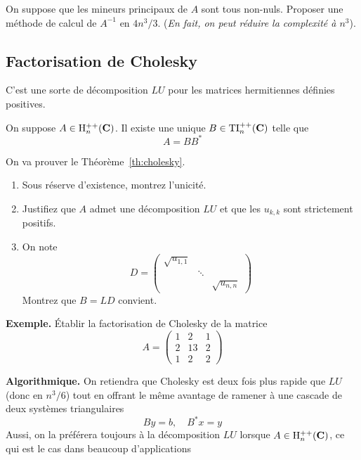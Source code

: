 \begin{exercice}
On suppose que les mineurs principaux de $A$ sont tous non-nuls. Proposer une
méthode de calcul de $A^{-1}$ en $\displaystyle {4n^3}/{3}$. (\emph{En fait,
on peut réduire la complexité à $n^3$}).
\end{exercice}


\subsection{Factorisation de Cholesky}

C'est une sorte de décomposition $LU$ pour les matrices hermitiennes définies
positives.

\begin{theorem}
\label{th:cholesky}
On suppose $A \in \mathrm{H}^{++}_n(\mathbf{C})$. Il existe une unique $B \in \mathrm{TI}^{++}_n(\mathbf{C})$
telle que
\[
A = B B^*
\]
\end{theorem}

\begin{exercice}
On va prouver le Théorème~\ref{th:cholesky}.
\begin{enumerate}
\item Sous réserve d'existence, montrez l'unicité.
\item Justifiez que $A$ admet une décomposition $LU$ et que les $u_{k,k}$ sont strictement positifs.
\item On note 
\[
D = \left(\begin{array}{ccc}
\sqrt{u_{1,1}} & & \\
& \ddots & \\
& & \sqrt{u_{n,n}}
\end{array}\right)
\]
Montrez que $B = LD$ convient.
\end{enumerate}
\end{exercice}

{\bf Exemple.}
Établir la factorisation de Cholesky de la matrice
\[
A = \left(\begin{array}{ccc}
1 & 2 & 1 \\
2 & 13 & 2 \\
 1 & 2 & 2
\end{array}\right)
\]

{\bf Algorithmique.}
On retiendra que Cholesky est deux fois plus rapide que $LU$ (donc en
$n^3/6$) tout en offrant le même avantage de ramener à une cascade de deux
systèmes triangulaires
\[
By = b, \quad B^*x = y
\]
Aussi, on la préférera toujours à la décomposition $LU$ lorsque $A \in \mathrm{H}^{++}_n(\mathbf{C})$,
ce qui est le cas dans beaucoup d'applications

